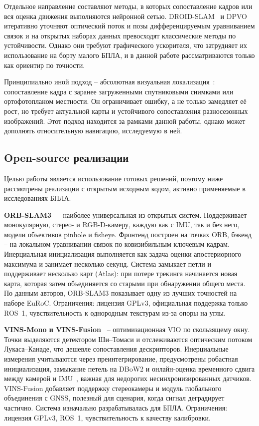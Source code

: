     Отдельное направление составляют методы, в которых сопоставление кадров или вся оценка движения выполняются нейронной сетью.
    DROID-SLAM~\cite{droid_slam} и DPVO~\cite{dpvo} итеративно уточняют оптический поток и позы дифференцируемым уравниванием связок и на открытых наборах данных превосходят классические методы по устойчивости.
    Однако они требуют графического ускорителя, что затрудняет их использование на борту малого БПЛА, и в данной работе рассматриваются только как ориентир по точности.

    Принципиально иной подход -- абсолютная визуальная локализация~\cite{avl_review}: сопоставление кадра с заранее загруженными спутниковыми снимками или ортофотопланом местности.
    Он ограничивает ошибку, а не только замедляет её рост, но требует актуальной карты и устойчивого сопоставления разносезонных изображений.
    Этот подход находится за рамками данной работы, однако может дополнять относительную навигацию, исследуемую в ней.

    \subsection{Open-source реализации}

    Целью работы является использование готовых решений, поэтому ниже рассмотрены реализации с открытым исходным кодом, активно применяемые в исследованиях БПЛА.

    \textbf{ORB-SLAM3}~\cite{orbslam3} -- наиболее универсальная из открытых систем.
    Поддерживает монокулярную, стерео- и RGB-D-камеру, каждую как с IMU, так и без него, модели объективов pinhole и fisheye.
    Фронтенд построен на точках ORB, бэкенд -- на локальном уравнивании связок по ковизибильным ключевым кадрам.
    Инерциальная инициализация выполняется как задача оценки апостериорного максимума и занимает несколько секунд.
    Система замыкает петли и поддерживает несколько карт (Atlas): при потере трекинга начинается новая карта, которая затем объединяется со старыми при обнаружении общего места.
    По данным авторов, ORB-SLAM3 показывает одну из лучших точностей на наборе EuRoC.
    Ограничения: лицензия GPLv3, официальная поддержка только ROS~1, чувствительность к однородным текстурам из-за опоры на углы.

    \textbf{VINS-Mono и VINS-Fusion}~\cite{vins_mono, vins_fusion} -- оптимизационная VIO по скользящему окну.
    Точки выделяются детектором Ши--Томаси и отслеживаются оптическим потоком Лукаса--Канаде, что дешевле сопоставления дескрипторов.
    Инерциальные измерения учитываются через преинтегрирование, предусмотрены робастная инициализация, замыкание петель на DBoW2 и онлайн-оценка временного сдвига между камерой и IMU~\cite{vins_td}, важная для недорогих несинхронизированных датчиков.
    VINS-Fusion добавляет поддержку стереокамеры и модуль глобального объединения с GNSS, полезный для сценария, когда сигнал деградирует частично.
    Система изначально разрабатывалась для БПЛА.
    Ограничения: лицензия GPLv3, ROS~1, чувствительность к качеству калибровки.

